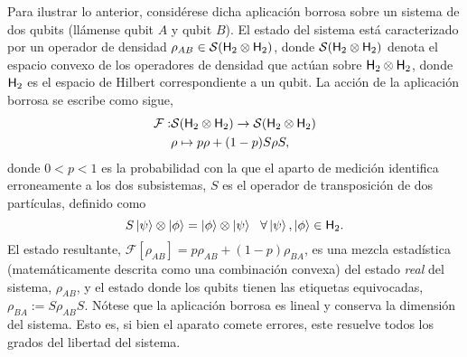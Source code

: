 \documentclass[10pt]{article}
\newcommand{\mcS}{\mathcal{S}}
\newcommand{\hilbert}{{\sf H}}
\newcommand{\mcF}{\mathcal{F}}
\newcommand{\Fuzzy}[1]{\mcF\left[#1\right]}
\begin{document}
Para ilustrar lo anterior, considérese dicha aplicación borrosa sobre un sistema de dos qubits (llámense qubit $A$ y qubit $B$). El estado del sistema está caracterizado por un operador de densidad $\rho_{AB} \in \mcS(\hilbert_2 \otimes \hilbert_2)$, donde $\mcS(\hilbert_2 \otimes \hilbert_2)$ denota el espacio convexo de los operadores de densidad que actúan sobre $\hilbert_2 \otimes \hilbert_2$, donde $\hilbert_2$ es el espacio de Hilbert correspondiente a un qubit. La acción de la aplicación borrosa se escribe como sigue,
\begin{align*}
\mcF:&\mcS(\hilbert_2 \otimes \hilbert_2)\to \mcS(\hilbert_2 \otimes \hilbert_2)\nonumber\\
&\rho \mapsto p\rho+(1-p)S\rho S,
\end{align*}
donde $0<p<1$ es la probabilidad con la que el aparto de medición identifica erroneamente a los dos subsistemas, $S$ es el operador de transposición de dos partículas, definido como 
$$S\ket{\psi}\otimes \ket{\phi}=\ket{\phi}\otimes \ket{\psi} \ \ \forall \ket{\psi},\ket{\phi}\in \hilbert_2.$$
%
El estado resultante, $\Fuzzy{\rho_{AB}}=p\rho_{AB}+(1-p)\rho_{BA}$, es una mezcla estadística (matemáticamente descrita como una combinación convexa) del estado \textit{real} del sistema, $\rho_{AB}$, y el estado donde los qubits tienen las etiquetas equivocadas, $\rho_{BA}:=S\rho_{AB} S$. Nótese que la aplicación borrosa es lineal y conserva la dimensión del sistema. Esto es, si bien el aparato comete errores, este resuelve todos los grados del libertad del sistema.
\end{document}
